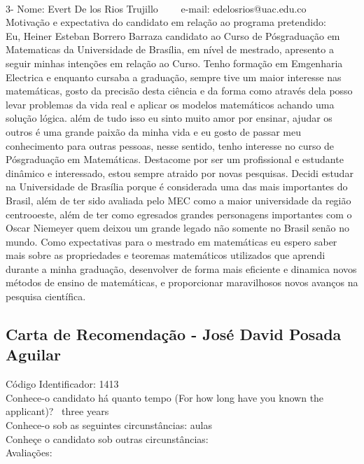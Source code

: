 \documentclass[11pt]{article}
\begin{document}
\\
3- Nome: Evert De los Rios Trujillo
\ \ \ \ e-mail: edelosrios@uac.edu.co
\\[0.2cm]
Motivação e expectativa do candidato em relação ao programa pretendido:
\\Eu, Heiner Esteban Borrero Barraza candidato ao Curso de Pósgraduação em Matematicas da Universidade de Brasília, em nível de mestrado, apresento a seguir minhas intenções em relação ao Curso. 
Tenho formação em Emgenharia Electrica e enquanto cursaba a graduação, sempre tive um maior interesse nas matemáticas, gosto da precisão desta ciência e da forma como através dela posso levar problemas da vida real e aplicar os modelos matemáticos achando uma solução lógica. além de tudo isso eu sinto muito amor por ensinar, ajudar os outros é uma grande paixão da minha vida e eu gosto de passar meu conhecimento para outras pessoas, nesse sentido, tenho interesse no curso de Pósgraduação em Matemáticas. Destacome por ser um profissional e estudante dinâmico e interessado, estou sempre atraido por novas pesquisas. Decidi estudar na Universidade de Brasília porque é considerada uma das mais importantes do Brasil, além de ter sido avaliada pelo MEC como a maior universidade da região centrooeste, além de ter como egresados grandes personagens importantes com o Oscar Niemeyer quem deixou um grande legado não somente no Brasil senão no mundo. Como expectativas para o mestrado em matemáticas eu espero saber mais sobre as propriedades e teoremas matemáticos utilizados que aprendi durante a minha graduação, desenvolver de forma mais eficiente e dinamica novos métodos de ensino de matemáticas, e proporcionar maravilhosos novos avanços na pesquisa científica. 
\newpage\vspace*{-4cm}\subsection*{Carta de Recomendação - José David Posada Aguilar}Código Identificador: 1413\\Conhece-o candidato há quanto tempo (For how long have you known the applicant)? 
\ three years
\\ Conhece-o sob as seguintes circunstâncias: aulas\ \ 
	\ \ \ \  
\\ Conheçe o candidato sob outras circunstâncias: 
\\	Avaliações:\\
\end{document}
